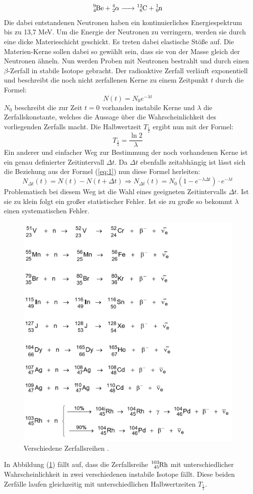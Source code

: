 \begin{equation*}
    \ce{^{9}_{4}Be + ^{4}_{2}$\alpha$ -> ^{12}_{6}C + ^1_0n}
\end{equation*}
Die dabei entstandenen Neutronen haben ein kontinuierliches Energiespektrum bis zu 13,7 MeV. Um die Energie der Neutronen zu verringern, werden sie durch eine
dicke Materieschicht geschickt. Es treten dabei elastische Stöße auf. Die
Materien-Kerne sollen dabei so gewählt sein, dass sie von der Masse gleich der Neutronen ähneln.
Nun werden Proben mit Neutronen bestrahlt und durch einen $\beta$-Zerfall in stabile Isotope gebracht.
Der radioaktive Zerfall verläuft exponentiell und beschreibt die noch nicht zerfallenen Kerne zu einem Zeitpunkt $t$ durch die Formel:
\begin{equation}
  N(t)= N_0 e^{-\lambda t}
  \label{eq:1}
\end{equation}
$N_0$ beschreibt die zur Zeit $t = 0$ vorhanden instabile Kerne und $\lambda$ die Zerfallskonstante, welches die Aussage über die Wahrscheinlichkeit
des vorliegenden Zerfalls macht.
Die Halbwertzeit $T_{\frac{1}{2}}$ ergibt nun mit der Formel:
\begin{equation}
  T_{\frac{1}{2}} = \frac{\ln 2}{\lambda}
  \label{eq:2}
\end{equation}
Ein anderer und einfacher Weg zur Bestimmung der noch vorhandenen Kerne ist
ein genau definierter Zeitintervall $\Delta t$.
Da $\Delta t$ ebenfalls zeitabhängig ist lässt sich die Beziehung aus der Formel (\ref{eq:1})
nun diese Formel herleiten:
\begin{equation}
  N_{\Delta t} (t) = N(t) - N(t+\Delta t) \Rightarrow N_{\Delta t} (t) =N_0 (1-e^{-\lambda \Delta t}) \cdot e^{-\lambda t}
  \label{eq:3}
\end{equation}
Problematisch bei diesem Weg ist die Wahl eines geeigneten Zeitintervalls $\Delta t$. Ist sie zu klein folgt ein großer statistischer Fehler.
Ist sie zu große so bekommt $\lambda$ einen systematischen Fehler.
\begin{figure}
  \includegraphics[width=14 cm, height= 10 cm]{content/Verlauf.jpg}
  \caption{Verschiedene Zerfallsreihen \cite{1}.}
  \label{abb:1}
\end{figure}
In Abbildung (\ref{abb:1}) fällt auf, dass die Zerfallsreihe $\ce{^{103}_{45}Rh}$ mit unterschiedlicher Wahrscheinlichkeit
in zwei verschiedenen instabile Isotope fällt.
Diese beiden Zerfälle laufen gleichzeitig mit unterschiedlichen Halbwertzeiten $T_{\frac{1}{2}}$.

